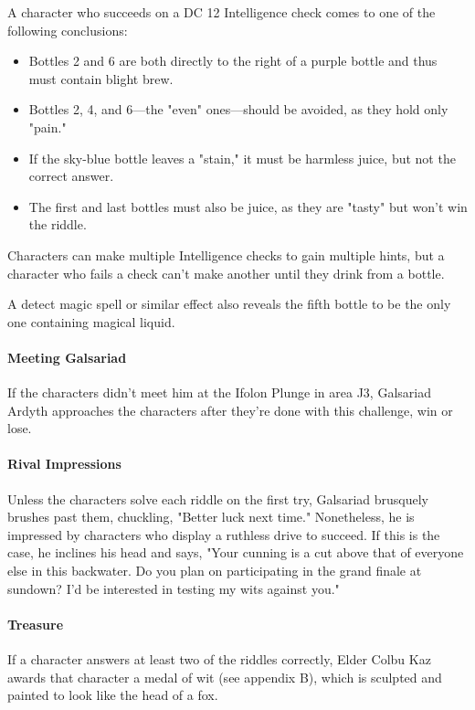 \documentclass[10pt,a4paper,twoside,bg=print,twocolumn,openany,nodeprecatedcode]{dndbook}
\begin{document}
A character who succeeds on a DC 12 Intelligence check comes to one of the following conclusions:


\begin{itemize}
\item Bottles 2 and 6 are both directly to the right of a purple bottle and thus must contain blight brew.
\item Bottles 2, 4, and 6—the "even" ones—should be avoided, as they hold only "pain."
\item If the sky-blue bottle leaves a "stain," it must be harmless juice, but not the correct answer.
\item The first and last bottles must also be juice, as they are "tasty" but won't win the riddle.
\end{itemize}

Characters can make multiple Intelligence checks to gain multiple hints, but a character who fails a check can't make another until they drink from a bottle.

A detect magic spell or similar effect also reveals the fifth bottle to be the only one containing magical liquid.

\paragraph{Meeting Galsariad}
If the characters didn't meet him at the Ifolon Plunge in area J3, Galsariad Ardyth approaches the characters after they're done with this challenge, win or lose.

\paragraph{Rival Impressions}
Unless the characters solve each riddle on the first try, Galsariad brusquely brushes past them, chuckling, "Better luck next time." Nonetheless, he is impressed by characters who display a ruthless drive to succeed. If this is the case, he inclines his head and says, "Your cunning is a cut above that of everyone else in this backwater. Do you plan on participating in the grand finale at sundown? I'd be interested in testing my wits against you."

\paragraph{Treasure}
If a character answers at least two of the riddles correctly, Elder Colbu Kaz awards that character a medal of wit (see appendix B), which is sculpted and painted to look like the head of a fox.
\end{document}
